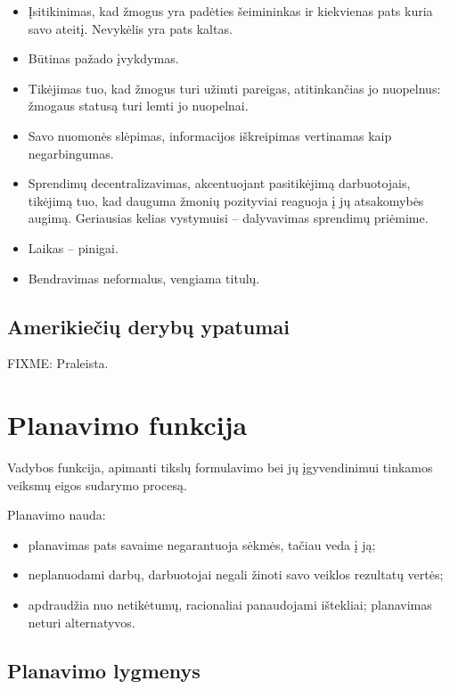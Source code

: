 \begin{itemize}
  \item Įsitikinimas, kad žmogus yra padėties šeimininkas ir kiekvienas
    pats kuria savo ateitį. Nevykėlis yra pats kaltas.
  \item Būtinas pažado įvykdymas.
  \item Tikėjimas tuo, kad žmogus turi užimti pareigas, atitinkančias
    jo nuopelnus: žmogaus statusą turi lemti jo nuopelnai.
  \item Savo nuomonės slėpimas, informacijos iškreipimas vertinamas
    kaip negarbingumas.
  \item Sprendimų decentralizavimas, akcentuojant pasitikėjimą
    darbuotojais, tikėjimą tuo, kad dauguma žmonių pozityviai reaguoja
    į jų atsakomybės augimą. Geriausias kelias vystymuisi – dalyvavimas
    sprendimų priėmime.
  \item Laikas – pinigai.
  \item Bendravimas neformalus, vengiama titulų.
\end{itemize}

\section{Amerikiečių derybų ypatumai}

FIXME: Praleista.

\chapter{Planavimo funkcija}

\begin{defn}[Planavimas]
  Vadybos funkcija, apimanti tikslų formulavimo bei jų įgyvendinimui
  tinkamos veiksmų eigos sudarymo procesą.
\end{defn}

Planavimo nauda:
\begin{itemize}
  \item planavimas pats savaime negarantuoja sėkmės, tačiau veda į ją;
  \item neplanuodami darbų, darbuotojai negali žinoti savo veiklos
    rezultatų vertės;
  \item apdraudžia nuo netikėtumų, racionaliai panaudojami ištekliai;
    planavimas neturi alternatyvos. %
\end{itemize}

\section{Planavimo lygmenys}

